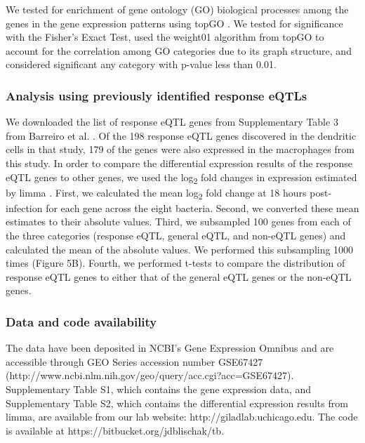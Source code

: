 We tested for enrichment of gene ontology (GO) biological processes
among the genes in the gene expression patterns using topGO
\citep{Alexa2006}. We tested for significance with the Fisher's Exact
Test, used the weight01 algorithm from topGO to account for the
correlation among GO categories due to its graph structure, and
considered significant any category with p-value less than 0.01.

\subsubsection{Analysis using previously identified response
eQTLs}\label{analysis-using-previously-identified-response-eqtls}

We downloaded the list of response eQTL genes from Supplementary Table 3
from Barreiro et al. \citep{Barreiro2012}. Of the 198 response eQTL genes
discovered in the dendritic cells in that study, 179 of the genes were
also expressed in the macrophages from this study. In order to compare
the differential expression results of the response eQTL genes to other
genes, we used the log\textsubscript{2} fold changes in expression
estimated by limma \citep{Ritchie2015}. First, we calculated the mean
log\textsubscript{2} fold change at 18 hours post-infection for each
gene across the eight bacteria. Second, we converted these mean
estimates to their absolute values. Third, we subsampled 100 genes from
each of the three categories (response eQTL, general eQTL, and non-eQTL
genes) and calculated the mean of the absolute values. We performed this
subsampling 1000 times (Figure 5B). Fourth, we performed t-tests to
compare the distribution of response eQTL genes to either that of the
general eQTL genes or the non-eQTL genes.

\subsubsection{Data and code
availability}\label{data-and-code-availability}

The data have been deposited in NCBI's Gene Expression Omnibus
\citep{Edgar2002} and are accessible through GEO Series accession number
GSE67427 (http://www.ncbi.nlm.nih.gov/geo/query/acc.cgi?acc=GSE67427).
Supplementary Table S1, which contains the gene expression data, and
Supplementary Table S2, which contains the differential expression
results from limma, are available from our lab website:
http://giladlab.uchicago.edu. The code is available at
https://bitbucket.org/jdblischak/tb.

